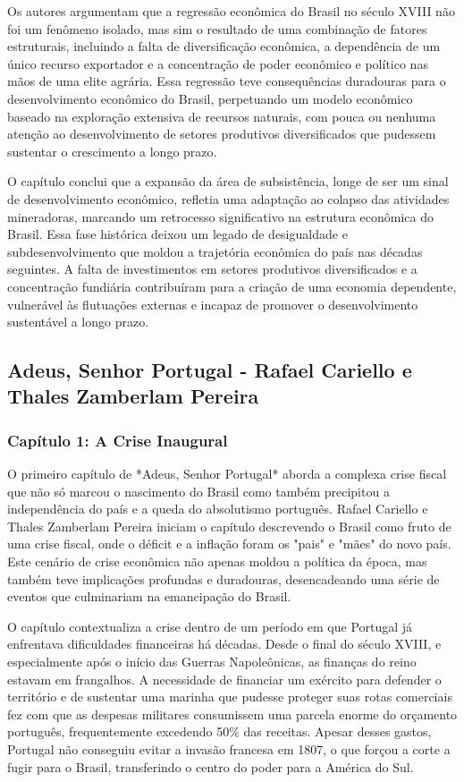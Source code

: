 \documentclass[a4paper,12pt]{article}[abntex2]
\begin{document}
Os autores argumentam que a regressão econômica do Brasil no século XVIII não foi um fenômeno isolado, mas sim o resultado de uma combinação de fatores estruturais, incluindo a falta de diversificação econômica, a dependência de um único recurso exportador e a concentração de poder econômico e político nas mãos de uma elite agrária. Essa regressão teve consequências duradouras para o desenvolvimento econômico do Brasil, perpetuando um modelo econômico baseado na exploração extensiva de recursos naturais, com pouca ou nenhuma atenção ao desenvolvimento de setores produtivos diversificados que pudessem sustentar o crescimento a longo prazo.

O capítulo conclui que a expansão da área de subsistência, longe de ser um sinal de desenvolvimento econômico, refletia uma adaptação ao colapso das atividades mineradoras, marcando um retrocesso significativo na estrutura econômica do Brasil. Essa fase histórica deixou um legado de desigualdade e subdesenvolvimento que moldou a trajetória econômica do país nas décadas seguintes. A falta de investimentos em setores produtivos diversificados e a concentração fundiária contribuíram para a criação de uma economia dependente, vulnerável às flutuações externas e incapaz de promover o desenvolvimento sustentável a longo prazo.

\subsection{\textbf{Adeus, Senhor Portugal - Rafael Cariello e Thales Zamberlam Pereira}}

\subsubsection{\textbf{Capítulo 1: A Crise Inaugural}}

O primeiro capítulo de *Adeus, Senhor Portugal* aborda a complexa crise fiscal que não só marcou o nascimento do Brasil como também precipitou a independência do país e a queda do absolutismo português. Rafael Cariello e Thales Zamberlam Pereira iniciam o capítulo descrevendo o Brasil como fruto de uma crise fiscal, onde o déficit e a inflação foram os "pais" e "mães" do novo país. Este cenário de crise econômica não apenas moldou a política da época, mas também teve implicações profundas e duradouras, desencadeando uma série de eventos que culminariam na emancipação do Brasil.

O capítulo contextualiza a crise dentro de um período em que Portugal já enfrentava dificuldades financeiras há décadas. Desde o final do século XVIII, e especialmente após o início das Guerras Napoleônicas, as finanças do reino estavam em frangalhos. A necessidade de financiar um exército para defender o território e de sustentar uma marinha que pudesse proteger suas rotas comerciais fez com que as despesas militares consumissem uma parcela enorme do orçamento português, frequentemente excedendo 50\% das receitas. Apesar desses gastos, Portugal não conseguiu evitar a invasão francesa em 1807, o que forçou a corte a fugir para o Brasil, transferindo o centro do poder para a América do Sul.
\end{document}
